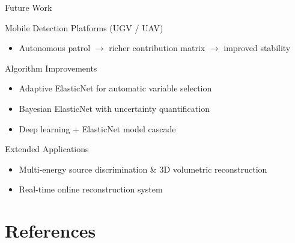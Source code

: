 \documentclass{sysupptthesis}
\begin{document}
\begin{frame}{Future Work}
    \begin{block}{Mobile Detection Platforms (UGV / UAV)}
        \begin{itemize}\footnotesize
            \item Autonomous patrol $\rightarrow$ richer contribution matrix $\rightarrow$ improved stability
        \end{itemize}
    \end{block}

    \begin{block}{Algorithm Improvements}
        \begin{itemize}\footnotesize
            \item Adaptive ElasticNet for automatic variable selection
            \item Bayesian ElasticNet with uncertainty quantification
            \item Deep learning + ElasticNet model cascade
        \end{itemize}
    \end{block}

    \begin{block}{Extended Applications}
        \begin{itemize}\footnotesize
            \item Multi-energy source discrimination \& 3D volumetric reconstruction
            \item Real-time online reconstruction system
        \end{itemize}
    \end{block}
\end{frame}

\section{References}
\end{document}
